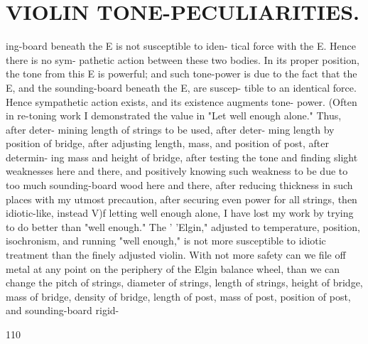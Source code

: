 \documentclass{article}
\begin{document}
\section*{VIOLIN TONE-PECULIARITIES.}
ing-board beneath the E is not susceptible to iden- tical force with the E. Hence there is no sym- pathetic action between these two bodies. In its proper position, the tone from this E is powerful; and such tone-power is due to the fact that the E, and the sounding-board beneath the E, are suscep- tible to an identical force. Hence sympathetic action exists, and its existence augments tone- power. (Often in re-toning work I demonstrated the value in "Let well enough alone." Thus, after deter- mining length of strings to be used, after deter- ming length by position of bridge, after adjusting length, mass, and position of post, after determin- ing mass and height of bridge, after testing the tone and finding slight weaknesses here and there, and positively knowing such weakness to be due to too much sounding-board wood here and there, after reducing thickness in such places with my utmost precaution, after securing even power for all strings, then idiotic-like, instead V)f letting well enough alone, I have lost my work by trying to do better than "well enough." The ' 'Elgin," adjusted to temperature, position, isochronism, and running "well enough," is not more susceptible to idiotic treatment than the finely adjusted violin. With not more safety can we file off metal at any point on the periphery of the Elgin balance wheel, than we can change the pitch of strings, diameter of strings, length of strings, height of bridge, mass of bridge, density of bridge, length of post, mass of post, position of post, and sounding-board rigid-

110
\end{document}
